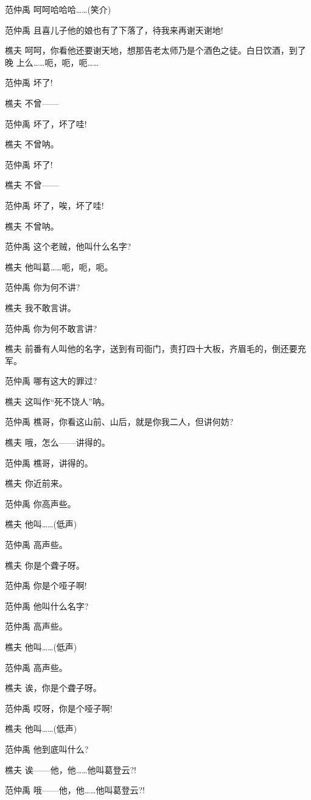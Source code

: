 范仲禹 呵呵哈哈哈\ldots{}\ldots{}(笑介)

范仲禹 且喜儿子他的娘也有了下落了，待我来再谢天谢地!

樵夫
呵呵，你看他还要谢天地，想那告老太师乃是个酒色之徒。白日饮酒，到了晚
上么\ldots{}\ldots{}呃，呃，呃\ldots{}\ldots{}

范仲禹 坏了!

樵夫 不曾------

范仲禹 坏了，坏了哇!

樵夫 不曾呐。

范仲禹 坏了!

樵夫 不曾------

范仲禹 坏了，唉，坏了哇!

樵夫 不曾呐。

范仲禹 这个老贼，他叫什么名字?

樵夫 他叫葛\ldots{}\ldots{}呃，呃，呃。

范仲禹 你为何不讲?

樵夫 我不敢言讲。

范仲禹 你为何不敢言讲?

樵夫
前番有人叫他的名字，送到有司衙门，责打四十大板，齐眉毛的，倒还要充军。

范仲禹 哪有这大的罪过?

樵夫 这叫作``死不饶人''呐。

范仲禹 樵哥，你看这山前、山后，就是你我二人，但讲何妨?

樵夫 哦，怎么------讲得的。

范仲禹 樵哥，讲得的。

樵夫 你近前来。

范仲禹 你高声些。

樵夫 他叫\ldots{}\ldots{}(低声)

范仲禹 高声些。

樵夫 你是个聋子呀。

范仲禹 你是个哑子啊!

范仲禹 他叫什么名字?

范仲禹 高声些。

樵夫 他叫\ldots{}\ldots{}(低声)

范仲禹 高声些。

樵夫 诶，你是个聋子呀。

范仲禹 哎呀，你是个哑子啊!

樵夫 他叫\ldots{}\ldots{}(低声)

范仲禹 他到底叫什么?

樵夫 诶------他，他\ldots{}\ldots{}他叫葛登云?!

范仲禹 哦------他，他\ldots{}\ldots{}他叫葛登云?!

